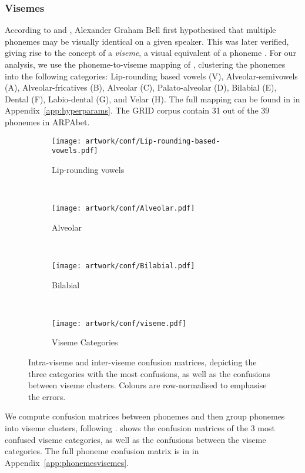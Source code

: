 \documentclass{article}
\begin{document}
\subsubsection{Visemes}

According to \citet{deland1931story} and \citet{fisher1968confusions}, Alexander Graham Bell first hypothesised that multiple phonemes may be visually identical on a given speaker. This was later verified, giving rise to the concept of a \emph{viseme}, a visual equivalent of a phoneme \citep{woodward1960phoneme,fisher1968confusions}.
For our analysis, we use the phoneme-to-viseme mapping of \cite{neti2000audio}, clustering the phonemes into the following categories: Lip-rounding based vowels (V), Alveolar-semivowels (A), Alveolar-fricatives (B), Alveolar (C), Palato-alveolar (D), Bilabial (E), Dental (F), Labio-dental (G), and Velar (H). The full mapping can be found in  in Appendix~\ref{app:hyperparams}. The GRID corpus contain 31 out of the 39 phonemes in ARPAbet.
\begin{figure}[htb]
    \centering
    \begin{subfigure}[t]{0.22\textwidth}
        \centering
        \texttt{[image: artwork/conf/Lip-rounding-based-vowels.pdf]}
        \caption{Lip-rounding vowels}
    \end{subfigure}~
    \begin{subfigure}[t]{0.22\textwidth}
        \centering
        \texttt{[image: artwork/conf/Alveolar.pdf]}
        \caption{Alveolar}
    \end{subfigure}~
    \begin{subfigure}[t]{0.22\textwidth}
        \centering
        \texttt{[image: artwork/conf/Bilabial.pdf]}
        \caption{Bilabial}
    \end{subfigure}~
    \begin{subfigure}[t]{0.22\textwidth}
        \centering
        \texttt{[image: artwork/conf/viseme.pdf]}
        \caption{Viseme Categories}
    \end{subfigure}\caption{Intra-viseme and inter-viseme confusion matrices, depicting the three categories with the most confusions, as well as the confusions between viseme clusters. Colours are row-normalised to emphasise the errors.}
    \label{fig:conf}
    \vspace{-1em}
\end{figure}
We compute confusion matrices between phonemes and then group phonemes into viseme clusters, following \cite{neti2000audio}.  shows the confusion matrices of the 3 most confused viseme categories, as well as the confusions between the viseme categories. The full phoneme confusion matrix is in  in Appendix~\ref{app:phonemesvisemes}.
\end{document}

